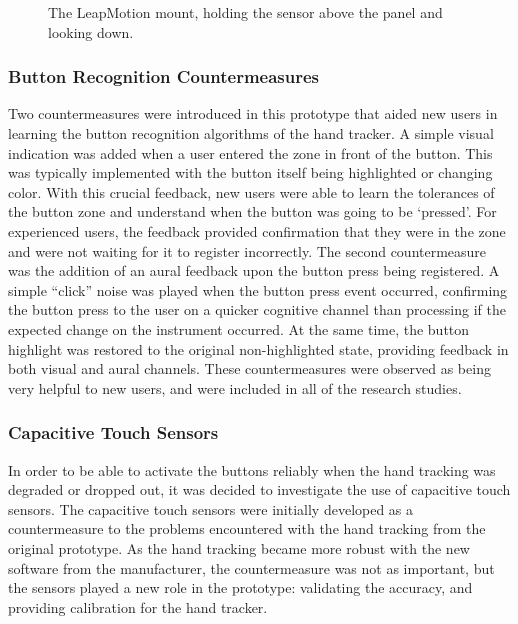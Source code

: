 \begin{figure}
    \centering
    \caption{The LeapMotion mount, holding the sensor above the panel and looking down.}
    \label{fig:proto_leap_mount}
\end{figure}

\subsubsection{Button Recognition Countermeasures}

Two countermeasures were introduced in this prototype that aided new users in learning the button recognition algorithms of the hand tracker.
A simple visual indication was added when a user entered the zone in front of the button.
This was typically implemented with the button itself being highlighted or changing color.
With this crucial feedback, new users were able to learn the tolerances of the button zone and understand when the button was going to be `pressed'.
For experienced users, the feedback provided confirmation that they were in the zone and were not waiting for it to register incorrectly.
The second countermeasure was the addition of an aural feedback upon the button press being registered.
A simple ``click'' noise was played when the button press event occurred, confirming the button press to the user on a quicker cognitive channel than processing if the expected change on the instrument occurred.
At the same time, the button highlight was restored to the original non-highlighted state, providing feedback in both visual and aural channels.
These countermeasures were observed as being very helpful to new users, and were included in all of the research studies.

\subsubsection{Capacitive Touch Sensors}
\label{sec:proto_cap_touch}

In order to be able to activate the buttons reliably when the hand tracking was degraded or dropped out, it was decided to investigate the use of capacitive touch sensors.
The capacitive touch sensors were initially developed as a countermeasure to the problems encountered with the hand tracking from the original prototype.
As the hand tracking became more robust with the new software from the manufacturer, the countermeasure was not as important, but the sensors played a new role in the prototype: validating the accuracy, and providing calibration for the hand tracker.

